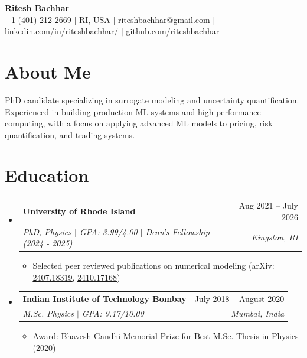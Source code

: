 \documentclass[letterpaper,11pt]{article}
\makeatletter
\newcommand{\resumeItem}[1]{
  \item\small{
    {#1 \vspace{-2pt}}
  }
}
\newcommand{\resumeSubheading}[4]{
  \vspace{-2pt}\item
    \begin{tabular*}{0.97\textwidth}[t]{l@{\extracolsep{\fill}}r}
      \textbf{#1} & #2 \\
      \textit{\small#3} & \textit{\small #4} \\
    \end{tabular*}\vspace{-7pt}
}
\newcommand{\resumeSubHeadingListStart}{\begin{itemize}[leftmargin=0.15in, label={}]}
\newcommand{\resumeSubHeadingListEnd}{\end{itemize}}
\newcommand{\resumeItemListStart}{\begin{itemize}}
\newcommand{\resumeItemListEnd}{\end{itemize}\vspace{-5pt}}
\makeatother
\begin{document}

\begin{center}
    \textbf{\Huge Ritesh Bachhar} \\ \vspace{1pt}
    \small +1-(401)-212-2669 $|$ RI, USA $|$
    \href{mailto:riteshbachhar@gmail.com}{\underline{riteshbachhar@gmail.com}} $|$ 
    \href{https://www.linkedin.com/in/riteshbachhar/}{\underline{linkedin.com/in/riteshbachhar/}} $|$
    \href{https://github.com/riteshbachhar}{\underline{github.com/riteshbachhar}}
\end{center}

\section{About Me}
PhD candidate specializing in surrogate modeling and uncertainty quantification. Experienced 
in building production ML systems and high-performance computing, with a focus on applying 
advanced ML models to pricing, risk quantification, and trading systems.


\section{Education}
  \resumeSubHeadingListStart
    \resumeSubheading
      {University of Rhode Island}{Aug 2021 -- July 2026}
      {PhD, Physics $|$ GPA: 3.99/4.00 $|$ Dean's Fellowship (2024 - 2025)}{Kingston, RI}
      \resumeItemListStart
        \resumeItem{Selected peer reviewed publications on numerical modeling 
        (arXiv: \href{https://arxiv.org/abs/2407.18319}{\underline{2407.18319}}, 
        \href{https://arxiv.org/abs/2410.17168}{\underline{2410.17168}})}
      \resumeItemListEnd
    \resumeSubheading
      {Indian Institute of Technology Bombay}{July 2018 -- August 2020}
      {M.Sc. Physics $|$ GPA: 9.17/10.00}{Mumbai, India}
      \resumeItemListStart
        \resumeItem{Award: Bhavesh Gandhi Memorial Prize for Best M.Sc. Thesis in Physics (2020)}
      \resumeItemListEnd
  \resumeSubHeadingListEnd
\end{document}
